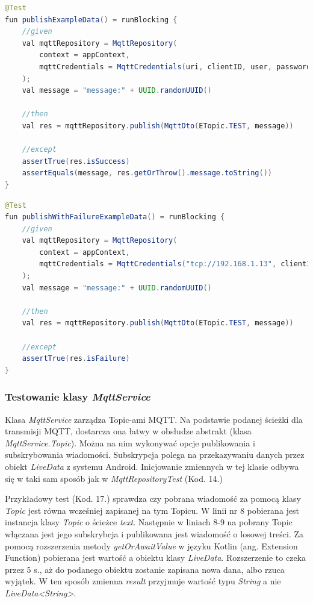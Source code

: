 \begin{lstlisting}[language=Java, caption=Test publikowania losowej wiadmości MQTT]
@Test
fun publishExampleData() = runBlocking {
    //given
    val mqttRepository = MqttRepository(
        context = appContext,
        mqttCredentials = MqttCredentials(uri, clientID, user, password)
    );
    val message = "message:" + UUID.randomUUID()

    //then
    val res = mqttRepository.publish(MqttDto(ETopic.TEST, message))

    //except
    assertTrue(res.isSuccess)
    assertEquals(message, res.getOrThrow().message.toString())
}
\end{lstlisting}

\begin{lstlisting}[language=Java, caption=Test publikowania wiadomości na nieistniejący broker MQTT]
@Test
fun publishWithFailureExampleData() = runBlocking {
    //given
    val mqttRepository = MqttRepository(
        context = appContext,
        mqttCredentials = MqttCredentials("tcp://192.168.1.13", clientID, user, password)
    );
    val message = "message:" + UUID.randomUUID()

    //then
    val res = mqttRepository.publish(MqttDto(ETopic.TEST, message))

    //except
    assertTrue(res.isFailure)
}
\end{lstlisting}



\subsubsection{Testowanie klasy \textit{MqttService}}


Klasa \textit{MqttService} zarządza Topic-ami MQTT. Na podstawie podanej ścieżki dla transmisji MQTT, dostarcza ona łatwy w obsłudze abstrakt (klasa \textit{MqttService.Topic}). Można na nim wykonywać opcje publikowania i subskrybowania wiadomości. Subskrypcja polega na przekazywaniu danych przez obiekt \textit{LiveData} z systemu Android. Inicjowanie zmiennych w tej klasie odbywa się w taki sam sposób jak w \textit{MqttRepositoryTest} (Kod. 14.)

Przykładowy test (Kod. 17.) sprawdza czy pobrana wiadomość za pomocą klasy \textit{Topic} jest równa wcześniej zapisanej na tym Topicu. W linii nr 8 pobierana jest instancja klasy \textit{Topic} o ścieżce \textit{text}. Następnie w liniach 8-9 na pobrany Topic włączana jest jego subskrybcja i publikowana jest wiadomość o losowej treści. Za pomocą rozszerzenia metody \textit{getOrAwaitValue} w języku Kotlin (ang. Extension Function) pobierana jest wartość a obiektu klasy \textit{LiveData}. Rozszerzenie to czeka przez 5 s., aż do podanego obiektu zostanie zapisana nowa dana, albo rzuca wyjątek. W ten sposób zmienna \textit{result} przyjmuje wartość typu \textit{String} a nie \textit{LiveData<String>}.



